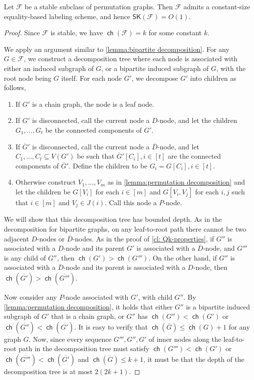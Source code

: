 \documentclass{theoretics}
\newcommand{\cF}{\ensuremath{\mathcal{F}}}
\newcommand{\RL}{\mathsf{SK}}
\DeclareMathOperator\ch{\mathsf{ch}}
\begin{document}
\begin{theorem}
\label{thm:permutation graphs}
Let $\cF$ be a stable subclass of permutation graphs. Then $\cF$ admits a constant-size
equality-based labeling scheme, and hence $\RL(\cF) = O(1)$.
\end{theorem}
\begin{proof}
Since $\cF$ is stable, we have $\ch(\cF) = k$ for some constant $k$.

We apply an argument similar to \cref{lemma:bipartite decomposition}. For any $G \in \cF$, we
construct a decomposition tree where each node is associated with either an induced subgraph of
$G$, or a bipartite induced subgraph of $G$, with the root node being $G$ itself. For each node
$G'$, we decompose $G'$ into children as follows,
\begin{enumerate}
  \item If $G'$ is a chain graph, the node is a leaf node.
  \item If $G'$ is disconnected, call the current node a $D$-node, and let the children $G_1,
    \dotsc, G_t$ be the connected components of $G'$.
  \item If $\overline G'$ is disconnected, call the current node a $\overline D$-node, and let
    $C_1, \dotsc, C_t \subseteq V(G')$ be such that $\overline{G}'[C_i], i \in [t]$ are the connected components of 
    $\overline G'$. Define the children to be $G_i = G[C_i], i \in [t]$.
  \item Otherwise construct $V_1, \dotsc, V_m$ as in \cref{lemma:permutation decomposition} and
    let the children be $G[V_i]$ for each $i \in [m]$ and $G[V_i,V_j]$ for each $i,j$ such that $i \in [m]$ and
    $V_j \in J(i)$. Call this node a $P$-node.
\end{enumerate}

We will show that this decomposition tree has bounded depth.  As in the decomposition for bipartite
graphs, on any leaf-to-root path there cannot be two adjacent $D$-nodes or $\overline D$-nodes. As
in the proof of \cref{cl: Qk-properties}, if $G''$ is associated with a $D$-node and its parent $G'$
is associated with a $\overline D$-node, and $G'''$ is any child of $G''$, then $\ch(G') >
\ch(G''')$. On the other hand, if $G''$ is associated with a $\overline D$-node and its parent is
associated with a $D$-node, then $\ch(\overline{G'}) > \ch(\overline{G'''})$.

Now consider any $P$-node associated with $G'$, with child $G''$. By \cref{lemma:permutation
decomposition}, it holds that either $G''$ is a bipartite induced subgraph of $G'$ that is a chain
graph, or $G''$ has $\ch(G'') < \ch(G')$ or $\ch(\overline{G''}) < \ch(\overline{G'})$.  It is easy
to verify that $\ch(\overline{G}) \leq \ch(G)+1$ for any graph $G$. Now, since every sequence
$G''',G'',G'$ of inner nodes along the leaf-to-root path in the decomposition tree must satisfy
$\ch(G''') < \ch(G')$ or $\ch(\overline{G'''}) < \ch(\overline{G'})$ and $\ch(\overline G) \leq
k+1$, it must be that the depth of the decomposition tree is at most $2(2k+1)$.


\end{proof}
\end{document}

